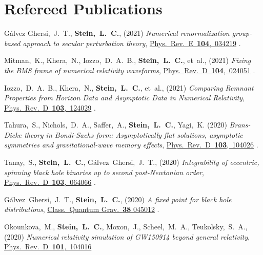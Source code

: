 \section{\sc Refereed Publications}
\addtocounter{pubCounter}{-1}
\begin{etaremune}[start=\value{pubCounter}]
\item
  Gálvez Ghersi,~J.~T.,
  {\bf Stein,~L.~C.},
  (2021)
  {\it Numerical renormalization group-based approach to secular perturbation theory},
  \href{https://doi.org/10.1103/PhysRevE.104.034219}%
  {Phys.~Rev.~E~{\bf 104},~034219}
  .
\item
  Mitman,~K.,
  Khera,~N.,
  Iozzo,~D.~A.~B.,
  {\bf Stein,~L.~C.},
  et~al.,
  (2021)
  {\it Fixing the BMS frame of numerical relativity waveforms},
  \href{https://doi.org/10.1103/PhysRevD.104.024051}%
  {Phys.~Rev.~D~{\bf 104},~024051}
  .
\item
  Iozzo,~D.~A.~B.,
  Khera,~N.,
  {\bf Stein,~L.~C.},
  et~al.,
  (2021)
  {\it Comparing Remnant Properties from Horizon Data and Asymptotic Data in Numerical Relativity},
  \href{https://doi.org/10.1103/PhysRevD.103.124029}%
  {Phys.~Rev.~D~{\bf 103},~124029}
  .
\item
  Tahura,~S.,
  Nichols,~D.~A.,
  Saffer,~A.,
  {\bf Stein,~L.~C.},
  Yagi,~K.
  (2020)
  {\it Brans-Dicke theory in Bondi-Sachs form: Asymptotically flat solutions, asymptotic symmetries and gravitational-wave memory effects},
  \href{https://doi.org/10.1103/PhysRevD.103.104026}%
  {Phys.~Rev.~D~{\bf 103},~104026}
  .
\item
  Tanay,~S.,
  {\bf Stein,~L.~C.},
  Gálvez~Ghersi,~J.~T.,
  (2020)
  {\it Integrability of eccentric, spinning black hole binaries up to second post-Newtonian order},
  \href{https://doi.org/10.1103/PhysRevD.103.064066}%
  {Phys.~Rev.~D~{\bf 103},~064066}
  .
\item
  Gálvez~Ghersi,~J.~T.,
  {\bf Stein,~L.~C.},
  (2020)
  {\it A fixed point for black hole distributions},
  \href{https://doi.org/10.1088/1361-6382/abcfd2}
  {Class.~Quantum Grav.~{\bf 38} 045012}
  .
\item
  Okounkova,~M.,
  {\bf Stein,~L.~C.},
  Moxon,~J.,
  Scheel,~M.~A.,
  Teukolsky,~S.~A.,
  (2020)
  {\it Numerical relativity simulation of GW150914 beyond general relativity},
  \href{https://doi.org/10.1103/PhysRevD.101.104016}{Phys.~Rev.~D~{\bf 101},~104016}

\end{etaremune}
